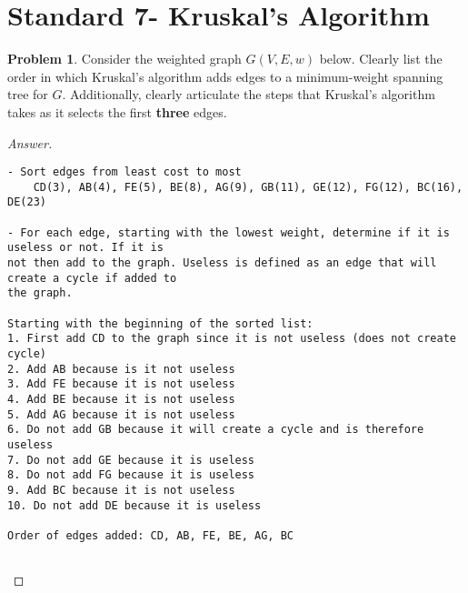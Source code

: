\documentclass[11pt]{article}
\theoremstyle{definition}
\theoremstyle{definition}
\newtheorem{required}{Problem}
\theoremstyle{definition}
\begin{document}
 
\newpage
\section{Standard 7- Kruskal's Algorithm}

\begin{required}
Consider the weighted graph $G(V, E, w)$ below. Clearly list the order in which Kruskal's algorithm adds edges to a minimum-weight spanning tree for $G$. Additionally, clearly articulate the steps that Kruskal's algorithm takes as it selects the first \textbf{three} edges.

\begin{center}
\end{center}
\end{required}


\begin{proof}[Answer]$ $
\begin{verbatim}
- Sort edges from least cost to most
    CD(3), AB(4), FE(5), BE(8), AG(9), GB(11), GE(12), FG(12), BC(16), DE(23) 

- For each edge, starting with the lowest weight, determine if it is useless or not. If it is
not then add to the graph. Useless is defined as an edge that will create a cycle if added to
the graph. 

Starting with the beginning of the sorted list: 
1. First add CD to the graph since it is not useless (does not create cycle)
2. Add AB because is it not useless 
3. Add FE because it is not useless
4. Add BE because it is not useless
5. Add AG because it is not useless
6. Do not add GB because it will create a cycle and is therefore useless
7. Do not add GE because it is useless
8. Do not add FG because it is useless
9. Add BC because it is not useless
10. Do not add DE because it is useless

Order of edges added: CD, AB, FE, BE, AG, BC


\end{verbatim}
\end{proof}
\end{document}
